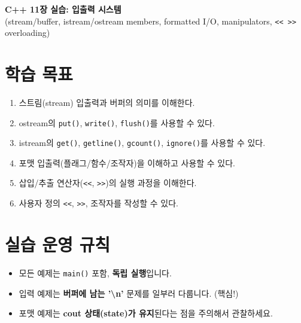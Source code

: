\documentclass[11pt,a4paper]{article}
\begin{document}
\begin{center}
  {\LARGE \textbf{C++ 11장 실습: 입출력 시스템}}\\
  \vspace{6pt}
  {\large (stream/buffer, istream/ostream members, formatted I/O, manipulators, \texttt{<< >>} overloading)}
\end{center}

\vspace{8pt}

\section*{학습 목표}
\begin{GoalBox}
\begin{enumerate}[leftmargin=18pt]
  \item 스트림(stream) 입출력과 버퍼의 의미를 이해한다. %
  \item ostream의 \texttt{put()}, \texttt{write()}, \texttt{flush()}를 사용할 수 있다. %
  \item istream의 \texttt{get()}, \texttt{getline()}, \texttt{gcount()}, \texttt{ignore()}를 사용할 수 있다. %
  \item 포맷 입출력(플래그/함수/조작자)을 이해하고 사용할 수 있다. %
  \item 삽입/추출 연산자(\texttt{<<}, \texttt{>>})의 실행 과정을 이해한다. %
  \item 사용자 정의 \texttt{<<}, \texttt{>>}, 조작자를 작성할 수 있다. %
\end{enumerate}
\end{GoalBox}

\section*{실습 운영 규칙}
\begin{itemize}[leftmargin=18pt]
  \item 모든 예제는 \texttt{main()} 포함, \textbf{독립 실행}입니다.
  \item 입력 예제는 \textbf{버퍼에 남는 '\textbackslash n'} 문제를 일부러 다룹니다. (핵심!)
  \item 포맷 예제는 \textbf{cout 상태(state)가 유지}된다는 점을 주의해서 관찰하세요.
\end{itemize}

\tableofcontents
\newpage

\end{document}
